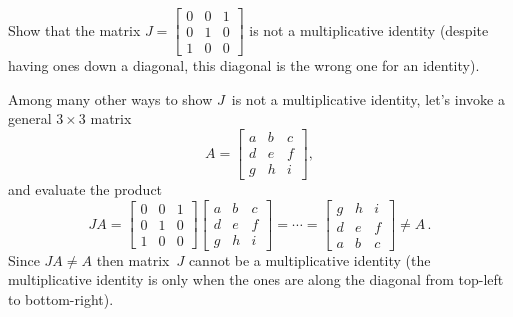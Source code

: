 \begin{reduce}
\begin{example} 
Show that the matrix \(J=\begin{bmatrix} 0&0&1\\0&1&0\\1&0&0 \end{bmatrix}\) is not a multiplicative identity (despite having ones down a diagonal, this diagonal is the wrong one for an identity).
\begin{solution} 
Among many other ways to show \(J\)~is not a multiplicative identity, let's invoke a general \(3\times3\) matrix
\begin{equation*}
A=\begin{bmatrix} a&b&c\\d&e&f\\g&h&i \end{bmatrix},
\end{equation*}
and evaluate the product
\begin{equation*}
JA=
\begin{bmatrix} 0&0&1\\0&1&0\\1&0&0 \end{bmatrix}
\begin{bmatrix} a&b&c\\d&e&f\\g&h&i \end{bmatrix}
=\cdots
=\begin{bmatrix} g&h&i\\d&e&f\\a&b&c \end{bmatrix}
\neq A\,.
\end{equation*}
Since \(JA\neq A\) then matrix~\(J\) cannot be a multiplicative identity (the multiplicative identity is only when the ones are along the diagonal from top-left to bottom-right).
\end{solution}
\end{example}
\end{reduce}




